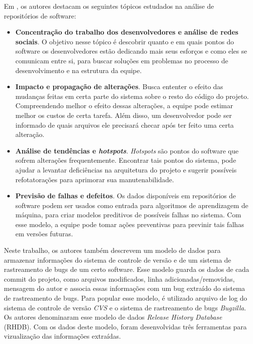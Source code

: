 \documentclass[a4paper, 12pt, twoside]{book}
\begin{document}
        Em \cite{DBLP:series/springer/DAmbrosGLP08}, os autores destacam os seguintes tópicos 
        estudados na análise de repositórios de software:
        \begin{itemize}
            \item \textbf{Concentração do trabalho dos desenvolvedores e análise de redes sociais}. 
            O objetivo nesse tópico é descobrir quanto e em quais pontos do software os desenvolvedores estão dedicando mais seus esforços e como eles se comunicam entre si, para buscar soluções em problemas no processo de desenvolvimento e na estrutura da equipe.
            \item \textbf{Impacto e propagação de alterações}. 
            Busca ententer o efeito das mudanças feitas em
            certa parte do sistema sobre o resto do código do projeto. Compreendendo melhor o efeito
            dessas alterações, a equipe pode estimar melhor os custos de certa tarefa. Além disso,
            um desenvolvedor pode ser informado de quais arquivos ele precisará checar após ter feito
            uma certa alteração.
            \item \textbf{Análise de tendências e \textit{hotspots}}. 
            \textit{Hotspots} são pontos do software
            que sofrem alterações frequentemente. Encontrar tais pontos do sistema, pode ajudar a 
            levantar deficiências na arquitetura do projeto e sugerir possíveis refotatorações para
            aprimorar sua manutenabilidade.
            \item \textbf{Previsão de falhas e defeitos}.
            Os dados disponíveis em repositórios de software
            podem ser usados como entrada para algoritmos de aprendizagem de máquina, para criar
            modelos preditivos de possíveis falhas no sistema. Com esse modelo, a equipe pode
            tomar ações preventivas para previnir tais falhas em versões futuras.
        \end{itemize}

        Neste trabalho, os autores também descrevem um modelo de dados para armazenar informações do
        sistema de controle de versão e de um sistema de rastreamento de bugs de um certo software.
        Esse modelo guarda os dados de cada commit do projeto, como arquivos modificados, linha adicionadas/removidas, mensagem do autor e associa essas informações com um bug extraído 
        do sistema de rastreamento de bugs. Para popular esse modelo, é utilizado arquivo de log
        do sistema de controle de versão \textit{CVS} e o sistema de rastreamento de bugs 
        \textit{Bugzilla}. Os autores denominaram esse modelo de dados \textit{Release History 
        Database} (RHDB). Com os dados deste modelo, foram desenvolvidas três ferramentas para 
        vizualização das informações extraídas.
\end{document}
